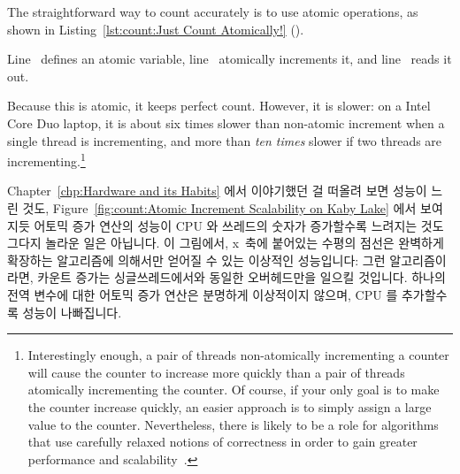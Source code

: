 The straightforward way to count accurately is to use atomic operations,
as shown in
Listing~\ref{lst:count:Just Count Atomically!} ().
\begin{lineref}
Line~ defines an atomic variable,
line~ atomically increments it, and
line~ reads it out.
\end{lineref}
Because this is atomic, it keeps perfect count.
However, it is slower: on a Intel Core Duo laptop, it is about
six times slower than non-atomic increment
when a single thread is incrementing, and more than \emph{ten times}
slower if two threads are incrementing.\footnote{
	Interestingly enough, a pair of threads non-atomically incrementing
	a counter will cause the counter to increase more quickly than
	a pair of threads atomically incrementing the counter.
	Of course, if your only goal is to make the counter increase
	quickly, an easier approach is to simply assign a large value
	to the counter.
	Nevertheless, there is likely to be a role for algorithms that
	use carefully relaxed notions of correctness in order to gain
	greater performance and
	scalability~\cite{Andrews91textbook,Arcangeli03,DavidUngar2011unsync}.}
\fi

Chapter~\ref{chp:Hardware and its Habits} 에서 이야기했던 걸 떠올려 보면
성능이 느린 것도,
Figure~\ref{fig:count:Atomic Increment Scalability on Kaby Lake} 에서 보여지듯
어토믹 증가 연산의 성능이 CPU 와 쓰레드의 숫자가 증가할수록 느려지는 것도
그다지 놀라운 일은 아닙니다.
이 그림에서, x~축에 붙어있는 수평의 점선은 완벽하게 확장하는 알고리즘에
의해서만 얻어질 수 있는 이상적인 성능입니다: 그런 알고리즘이라면, 카운트 증가는
싱글쓰레드에서와 동일한 오버헤드만을 일으킬 것입니다.
하나의 전역 변수에 대한 어토믹 증가 연산은 분명하게 이상적이지 않으며, CPU 를
추가할수록 성능이 나빠집니다.

